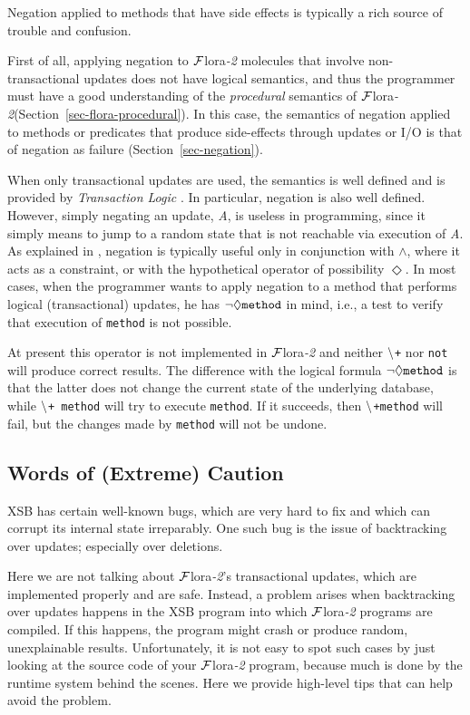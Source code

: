 \documentclass[11pt]{article}
\newcommand{\FLORA}{{\mbox{\sc ${\cal F}${lora}\rm\emph{-2}}}\xspace}
\newcommand{\NAF}{\mbox{\tt \ensuremath{\tt\backslash}+}\xspace}
\newcommand{\TNOT}{{{\tt not}}\xspace}
\begin{document}
Negation applied to methods that have side effects is typically a rich source
of trouble and confusion.

First of all, applying negation to \FLORA molecules that involve
non-transactional updates does not have logical semantics, and thus the
programmer must have a good understanding of the \emph{procedural} semantics of
\FLORA (Section~\ref{sec-flora-procedural}).
In this case, the semantics of negation applied to methods or predicates that produce
side-effects through updates  or I/O is that of negation as failure
(Section~\ref{sec-negation}).

When only transactional updates are used, the semantics is well defined and
is provided by \emph{Transaction Logic}
\cite{trans-chapter-98,trans-tcs94}. In particular, negation is also well
defined. However, simply negating an update, \emph{A}, is useless in
programming, since it simply means to jump to a random state that is not
reachable via execution of \emph{A}.  As explained in
\cite{trans-chapter-98,trans-tcs94}, negation is typically useful only in conjunction
with $\wedge$, where it acts as a constraint, or with the hypothetical
operator of possibility $\Diamond$. In most cases, when the programmer
wants to apply negation to a method that performs logical (transactional)
updates, he has $\tt \neg \Diamond method$ in mind, i.e., a test to
verify that execution of {\tt method} is not possible.

At present this operator is not implemented in \FLORA and neither \NAF
nor \TNOT will produce correct results.  The difference with
the logical formula $\tt \neg \Diamond method$ is that the latter does not
change the current state of the underlying database, while \NAF {\tt
  method} 
will try to execute {\tt method}. If it succeeds, then \NAF {\tt method} 
will fail, but the changes made by {\tt method} will not be undone.


\subsection{Words of (Extreme) Caution}

XSB has certain well-known bugs, which are very hard to fix and which can
corrupt its internal state irreparably. One such bug is the issue of
backtracking over updates; especially over deletions.

Here we are not talking about \FLORA's transactional updates, which are
implemented properly and are safe. Instead, a problem arises when
backtracking over updates happens in the XSB program into which \FLORA
programs are compiled. If this happens, the program might crash or produce
random, unexplainable results. Unfortunately, it is not easy to spot such
cases by just looking at the source code of your \FLORA program, because much
is done by the runtime system behind the scenes. Here we provide high-level
tips that can help avoid the problem.
\end{document}
